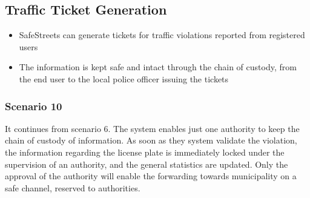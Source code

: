 \subsection{Traffic Ticket Generation}
\begin{itemize}
  \item SafeStreets can generate tickets for traffic violations reported from registered users
  \item The information is kept safe and intact through the chain of custody, from the end user to the local police officer issuing the tickets
\end{itemize}
\subsubsection{Scenario 10}
It continues from scenario 6. The system enables just one authority to keep the chain of custody of information. As soon as they system validate the violation, the information regarding the license plate is immediately locked under the supervision of an authority, and the general statistics are updated. Only the approval of the authority will enable the forwarding towards municipality on a safe channel, reserved to authorities.